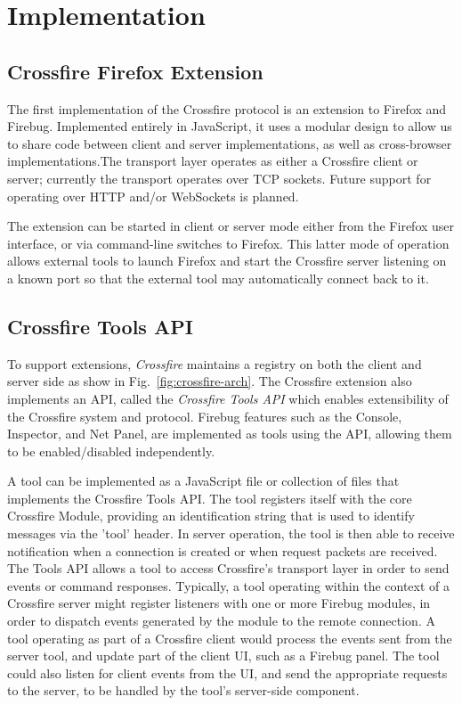 \section{Implementation}

\subsection{Crossfire Firefox Extension}
The first implementation of the Crossfire protocol is an extension to Firefox
and Firebug. Implemented entirely in JavaScript, it uses a modular design to
allow us to share code between client and server implementations, as well as
cross-browser implementations.The transport layer operates as either a Crossfire
client or server; currently the transport operates over TCP sockets.
Future support for operating over HTTP and/or WebSockets is planned.

The extension can be started in client or server mode either from the Firefox
user interface, or via command-line switches to Firefox. This latter mode of
operation allows external tools to launch Firefox and start the Crossfire server
listening on a known port so that the external tool may automatically connect
back to it.


\subsection{Crossfire Tools API}
To support extensions, \textit{Crossfire} maintains a registry on both the
client and server side as show in Fig.~\ref{fig:crossfire-arch}.
The Crossfire extension also implements an API, called the \textit{Crossfire
Tools API} which enables extensibility of the Crossfire system and protocol.
Firebug features such as the Console, Inspector, and Net Panel, are implemented as tools
using the API, allowing them to be enabled/disabled independently.

A tool can be implemented as a JavaScript file or collection of files that
implements the Crossfire Tools API. The tool registers itself with the core
Crossfire Module, providing an identification string that is used to identify
messages via the 'tool' header. In server operation, the tool is then able to
receive notification when a connection is created or when request packets are
received. The Tools API allows a tool to access Crossfire's transport layer in
order to send events or command responses.  Typically, a tool operating within
the context of a Crossfire server might register listeners with one or more
Firebug modules, in order to dispatch events generated by the module to the
remote connection. A tool operating as part of a Crossfire client would process
the events sent from the server tool, and update part of the client UI, such as
a Firebug panel. The tool could also listen for client events from the UI, and
send the appropriate requests to the server, to be handled by the tool's
server-side component.


